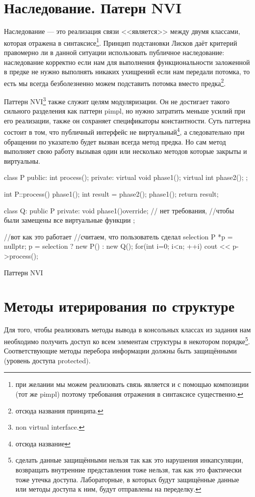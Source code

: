 \documentclass[12pt]{article}
\begin{document}
\section{Наследование. Патерн NVI}
Наследование --- это реализация связи <<является>> между двумя классами, которая отражена в 
синтаксисе\footnote{при желании мы можем реализовать связь является и с помощью композиции (тот же pimpl) поэтому 
требования отражения в синтаксисе существенно.}. Принцип подстановки Лисков даёт критерий правомерно ли в данной 
ситуации использовать публичное наследование: наследование корректно если нам для выполнения функциональности 
заложенной в предке не нужно выполнять никаких ухищрений если нам передали потомка, то есть мы всегда безболезненно 
можем подставить потомка вместо предка\footnote{отсюда названия принципа.}.

Паттерн NVI\footnote{non virtual interface.} также служит целям модуляризации. Он не достигает такого сильного 
разделения как паттерн pimpl, но нужно затратить меньше усилий при его реализации, также он сохраняет спецификаторы 
константности. Суть паттерна состоит в том, что публичный интерфейс не виртуальный\footnote{отсюда название}, а 
следовательно при обращении по указателю будет вызван всегда метод предка. Но сам метод выполняет свою работу вызывая 
один или несколько методов которые закрыты и виртуальны.

\begin{listing}[H]
\begin{center}
\begin{cppcode}
class P
{
public:
    int process();
private:
    virtual void phase1();
    virtual int phase2();
};

int P::process()
{
    phase1();
    int result = phase2();
    phase1();
    return result;
}

class Q: public P
{
private:
    void phase1()override; // нет требования, 
    //чтобы были замещены все виртуальные функции
};



//вот как это работает
//считаем, что пользователь сделал selection
P *p = nullptr;
p = selection ? new P() : new Q();
for(int i=0; i<n; ++i)
    cout << p->process();
\end{cppcode}
\end{center}
\caption{Паттерн NVI}
\label{lst:nvi}
\end{listing}

\section{Методы итерирования по структуре}
Для того, чтобы реализовать методы вывода в консольных классах из задания нам необходимо получить доступ ко всем 
элементам структуры в некотором порядке\footnote{сделать данные защищёнными нельзя так как это нарушения инкапсуляции, 
возвращать внутренние представления тоже нельзя, так как это фактически тоже утечка доступа. Лабораторные, в которых 
будут защищённые данные или методы доступа к ним, будут отправлены на переделку.}. Соответствующие методы перебора 
информации должны быть защищёнными (уровень доступа protected).
\end{document}
